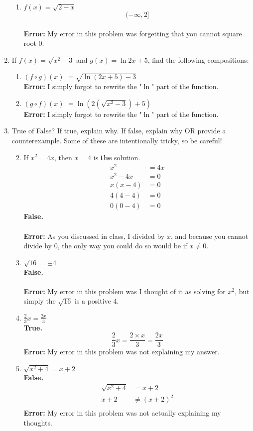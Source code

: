 \documentclass{article}
\begin{document}
\begin{enumerate}
\begin{enumerate}
			\item $f(x)=\sqrt{2-x}$ \\ $$(-\infty,2]$$ \\ \textbf{Error:} My error in this problem was forgetting that you cannot square root 0. 
		\end{enumerate}
\setcounter{enumi}{7}
	\item If $f(x)=\sqrt{x^2-3}$ and $g(x)=\ln{2x+5}$, find the following compositions:
	\begin{enumerate}
		\item $(f\circ g)(x)$
			$= \sqrt{\ln{(2x+5)}-3}$ \\ \textbf{Error:} I simply forgot to rewrite the "$\ln$" part of the function.
		\item $(g\circ f)(x)$
			$= \ln{(2(\sqrt{x^2-3})+5)}$ \\ \textbf{Error:} I simply forgot to rewrite the "$\ln$" part of the function.
	\end{enumerate}
\setcounter{enumi}{9}
	\item True of False? If true, explain why. If false, explain why OR provide a counterexample. Some of these are intentionally tricky, so be careful!
	\begin{enumerate}
	\setcounter{enumii}{1}
		\item If $x^2=4x$, then $x=4$ is \textbf{the} solution.
		\begin{align*}
			x^2 &= 4x \\
			x^2 -4x &= 0 \\
			x(x-4) &=0 \\
			4(4-4) &= 0 \\
			0(0-4) &= 0
		\end{align*}
		\textbf{False.} \\
		\\ \textbf{Error:} As you discussed in class, I divided by $x$, and because you cannot divide by 0, the only way you could do so would be if $x \neq 0$.
		\item $\sqrt{16}=\pm 4$\\
		\textbf{False.}\\ \\
		\textbf{Error:} My error in this problem was I thought of it as solving for $x^2$, but simply the $\sqrt{16}$ is a positive 4.
		\item $\frac{2}{3}x=\frac{2x}{3}$\\
		\textbf{True.}
		$$\frac{2}{3}x=\frac{2\times x}{3}=\frac{2x}{3}$$
		\textbf{Error:} My error in this problem was not explaining my answer.
		\item $\sqrt{x^2+4}=x+2$ \\
		\textbf{False.}
		\begin{align*}
		\sqrt{x^2+4}&=x+2 \\
		x + 2 &\neq (x+2)^2 \\
		\end{align*}
		\textbf{Error:} My error in this problem was not actually explaining my thoughts.
	\end{enumerate}
\end{enumerate}
\end{document}
